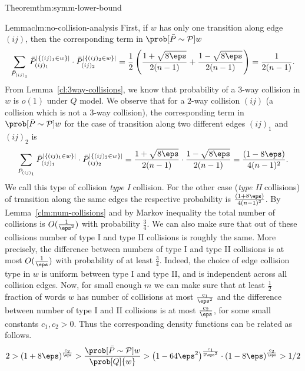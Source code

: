 \begin{prevproof}{Theorem}{thm:symm-lower-bound}
\begin{prevproof}{Lemma}{clm:no-collision-analysis}
	First, if $w$ has only one transition along edge $(ij)$, then the corresponding term in $\prob[\bar{P}\sim\mathcal{P}]{w}$ 
	\[
	\sum_{\bar{P}_{(ij)_1}} \bar{P}_{(ij)_1}^{|\{(ij)_1\in w\}|} \cdot\bar{P}_{(ij)_2}^{|\{(ij)_2\in w\}|}=\frac{1}{2}\left(\frac{1+\sqrt{8\eps}}{2(n-1)}+\frac{1-\sqrt{8\eps}}{2(n-1)}\right)=
	\frac{1}{2(n-1)}.
	\]
	From Lemma~\ref{cl:3way-collisions}, we know that probability of a $3$-way collision in $w$ is $o(1)$ under $Q$ model. We observe that for a $2$-way collision $(ij)$
	(a collision which is not a $3$-way collision), the corresponding term in $\prob[\bar{P}\sim\mathcal{P}]{w}$  for the case of transition along two different 
	edges $(ij)_1$ and $(ij)_2$ is
	\[
	\sum_{\bar{P}_{(ij)_1}} \bar{P}_{(ij)_1}^{|\{(ij)_1\in w\}|} \cdot\bar{P}_{(ij)_2}^{|\{(ij)_2\in w\}|}=\frac{1+\sqrt{8\eps}}{2(n-1)}\cdot\frac{1-\sqrt{8\eps}}{2(n-1)}=
	\frac{(1-8\eps)}{4(n-1)^2}.
	\] 
	We call this type of collision {\em type I} collision. For the other case ({\em type II} collisions) of transition along the same edges the respective probability is 
	$\frac{(1+8\eps)}{4(n-1)^2}$. By Lemma~\ref{clm:num-collisions} and by Markov inequality the total number of collisions is $O(\frac{1}{\eps^2})$ with probability $\frac{3}{4}$. 
	We can also make sure that out of these collisions number of type I and type II collisions is roughly the same. More precisely, the difference between numbers of 
	type I and type II collisions is at most $O(\frac{1}{\eps})$ with probability of at least $\frac{3}{4}$. Indeed, the choice of edge collision type in $w$ is uniform between type I and type II, and is
	independent across all collision edges. Now, for small enough $m$ we can make sure that at least $\frac{1}{2}$ fraction of words $w$ has number of collisions at most 
	$\frac{c_1}{\eps^2}$ and the difference between number of type I and II collisions is at most $\frac{c_2}{\eps}$, for some small constants $c_1,c_2>0$. Thus the corresponding density 
	functions can be related as follows.
	\[
	2>\left(1+8\eps\right)^{\frac{c_2}{\eps}}>\frac{\prob[\bar{P}\sim\mathcal{P}]{w}}{\prob[Q]{w}}>\left(1-64\eps^2\right)^{\frac{c_1}{2\eps^2}}\cdot \left(1-8\eps\right)^{\frac{c_2}{\eps}}>1/2
	\]

\end{prevproof}
\end{prevproof}
